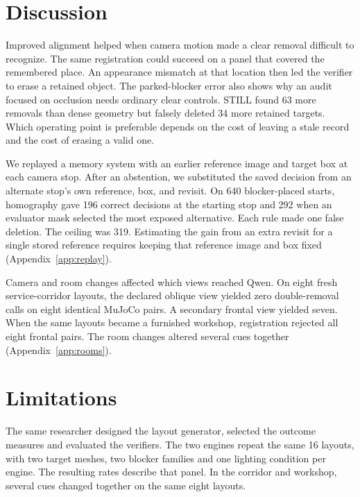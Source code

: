 \documentclass{article}
\begin{document}
\section{Discussion}

Improved alignment helped when camera motion made a clear removal difficult to recognize. The same registration could succeed on a panel that covered the remembered place. An appearance mismatch at that location then led the verifier to erase a retained object. The parked-blocker error also shows why an audit focused on occlusion needs ordinary clear controls.
STILL found 63 more removals than dense geometry but falsely deleted 34 more retained targets. Which operating point is preferable depends on the cost of leaving a stale record and the cost of erasing a valid one.

We replayed a memory system with an earlier reference image and target box at each camera stop. After an abstention, we substituted the saved decision from an alternate stop's own reference, box, and revisit. On 640 blocker-placed starts, homography gave 196 correct decisions at the starting stop and 292 when an evaluator mask selected the most exposed alternative. Each rule made one false deletion. The ceiling was 319. Estimating the gain from an extra revisit for a single stored reference requires keeping that reference image and box fixed (Appendix~\ref{app:replay}).

Camera and room changes affected which views reached Qwen. On eight fresh service-corridor layouts, the declared oblique view yielded zero double-removal calls on eight identical MuJoCo pairs. A secondary frontal view yielded seven. When the same layouts became a furnished workshop, registration rejected all eight frontal pairs. The room changes altered several cues together (Appendix~\ref{app:rooms}).

\section{Limitations}
\label{sec:limitations}

The same researcher designed the layout generator, selected the outcome measures and evaluated the verifiers. The two engines repeat the same 16 layouts, with two target meshes, two blocker families and one lighting condition per engine. The resulting rates describe that panel. In the corridor and workshop, several cues changed together on the same eight layouts.
\end{document}

